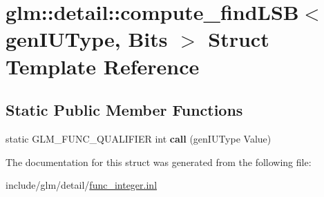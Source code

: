 \hypertarget{structglm_1_1detail_1_1compute__findLSB}{}\section{glm\+:\+:detail\+:\+:compute\+\_\+find\+L\+SB$<$ gen\+I\+U\+Type, Bits $>$ Struct Template Reference}
\label{structglm_1_1detail_1_1compute__findLSB}
\subsection*{Static Public Member Functions}
\begin{DoxyCompactItemize}
\item 
\mbox{\label{structglm_1_1detail_1_1compute__findLSB_a1c0ec72e2bcf35a3109e85cfc536400b}} 
static G\+L\+M\+\_\+\+F\+U\+N\+C\+\_\+\+Q\+U\+A\+L\+I\+F\+I\+ER int {\bfseries call} (gen\+I\+U\+Type Value)
\end{DoxyCompactItemize}


The documentation for this struct was generated from the following file\+:\begin{DoxyCompactItemize}
\item 
include/glm/detail/\hyperlink{func__integer_8inl}{func\+\_\+integer.\+inl}\end{DoxyCompactItemize}
